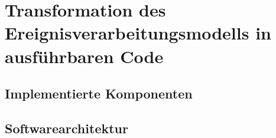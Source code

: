 \section{Transformation des Ereignisverarbeitungsmodells in ausführbaren Code}

\subsection{Implementierte Komponenten}

\subsection{Softwarearchitektur}

